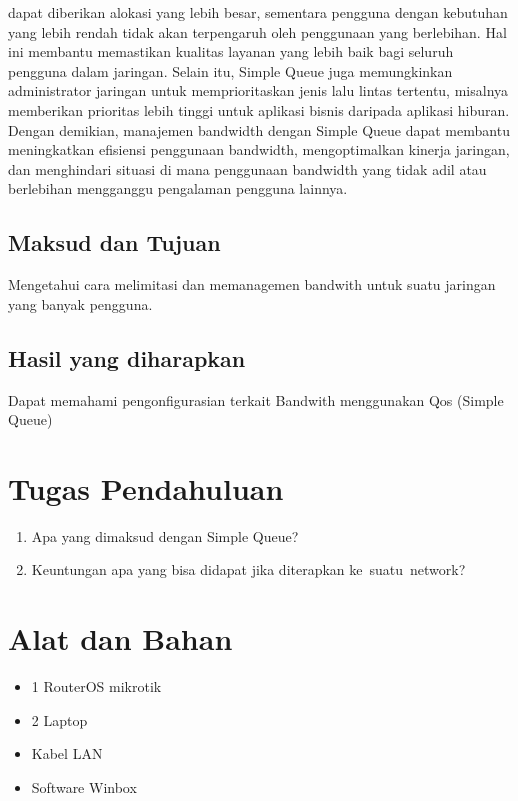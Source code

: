 dapat diberikan alokasi yang lebih besar, sementara pengguna dengan kebutuhan yang lebih rendah tidak akan terpengaruh oleh penggunaan yang berlebihan. Hal ini membantu
memastikan kualitas layanan yang lebih baik bagi seluruh pengguna dalam jaringan. Selain
itu, Simple Queue juga memungkinkan administrator jaringan untuk memprioritaskan jenis
lalu lintas tertentu, misalnya memberikan prioritas lebih tinggi untuk aplikasi bisnis daripada
aplikasi hiburan. Dengan demikian, manajemen bandwidth dengan Simple Queue dapat
membantu meningkatkan efisiensi penggunaan bandwidth, mengoptimalkan kinerja jaringan,
dan menghindari situasi di mana penggunaan bandwidth yang tidak adil atau berlebihan
mengganggu pengalaman pengguna lainnya.

\subsection{Maksud dan Tujuan}
Mengetahui cara melimitasi dan memanagemen bandwith untuk suatu jaringan yang banyak pengguna.

\subsection{Hasil yang diharapkan}
Dapat memahami pengonfigurasian terkait Bandwith menggunakan Qos (Simple Queue)

\section{Tugas Pendahuluan}
\begin{center}
	\colorbox{cyan!30}{\parbox{0.8\linewidth}{
    \begin{enumerate}
        \item Apa yang dimaksud dengan Simple Queue?
        \item Keuntungan apa yang bisa didapat jika diterapkan ke suatu network?
    \end{enumerate}}}
\end{center}

\section{Alat dan Bahan}
\begin{itemize}[label=$\bullet$, itemsep=-1pt, leftmargin=*]
	\item 1 RouterOS mikrotik
	\item 2 Laptop
	\item Kabel LAN
	\item Software Winbox
\end{itemize}


